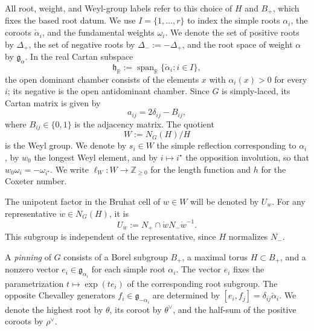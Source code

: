\documentclass[11pt,leqno]{amsart}
\numberwithin{equation}{section}
\theoremstyle{plain}
\theoremstyle{definition}
\theoremstyle{plain}
\theoremstyle{definition}
\theoremstyle{remark}
\newcommand{\g}{\mathfrak g}
\newcommand{\gh}{\mathfrak h}
\begin{document}
All root, weight, and Weyl-group labels refer to this choice of $H$ and $B_+$, which fixes the based root datum.  We use $I=\{1,\dots,r\}$ to index the simple roots $\alpha_i$, the coroots $\check\alpha_i$, and the fundamental weights $\omega_i$.  We denote the set of positive roots by $\Delta_+$, the set of negative roots by $\Delta_-:=-\Delta_+$, and the root space of weight $\alpha$ by $\g_\alpha$.  In the real Cartan subspace
\[
 \gh_{\mathbb R}:=\operatorname{span}_{\mathbb R}\{\check\alpha_i:i\in I\},
\]
the open dominant chamber consists of the elements $x$ with $\alpha_i(x)>0$ for every $i$; its negative is the open antidominant chamber.  Since $G$ is simply-laced, its Cartan matrix is given by
\begin{equation}
 a_{ij}=2\delta_{ij}-B_{ij},
\end{equation}
where $B_{ij}\in\{0,1\}$ is the adjacency matrix.  The quotient
\[
 W:=N_G(H)/H
\]
is the Weyl group.  We denote by $s_i\in W$ the simple reflection corresponding to $\alpha_i$, by $w_0$ the longest Weyl element, and by $i\mapsto i^\star$ the opposition involution, so that $w_0\omega_i=-\omega_{i^\star}$.  We write $\ell_W:W\to\mathbb Z_{\ge0}$ for the length function and $h$ for the Coxeter number.

The unipotent factor in the Bruhat cell of $w\in W$ will be denoted by $U_w$.  For any representative $\dot w\in N_G(H)$, it is
\begin{equation}\label{eq:weighted-Steinberg-cells}
 U_w:=N_+\cap\dot wN_-\dot w^{-1}.
\end{equation}
This subgroup is independent of the representative, since $H$ normalizes $N_-$.

A \emph{pinning} of $G$ consists of a Borel subgroup $B_+$, a maximal torus $H\subset B_+$, and a nonzero vector $e_i\in\g_{\alpha_i}$ for each simple root $\alpha_i$.  The vector $e_i$ fixes the parametrization $t\mapsto\exp(te_i)$ of the corresponding root subgroup.  The opposite Chevalley generators $f_i\in\g_{-\alpha_i}$ are determined by $[e_i,f_j]=\delta_{ij}\check\alpha_i$.  We denote the highest root by $\theta$, its coroot by $\theta^\vee$, and the half-sum of the positive coroots by $\rho^\vee$.
\end{document}
